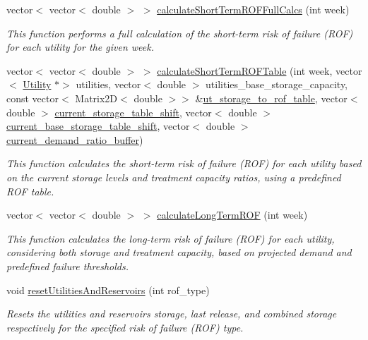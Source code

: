 \begin{DoxyCompactItemize}
vector$<$ vector$<$ double $>$ $>$ \mbox{\hyperlink{classContinuityModelROF_a975e7566b4c0db6e3731647b6e76b9c8}{calculate\+Short\+Term\+R\+O\+F\+Full\+Calcs}} (int week)
\begin{DoxyCompactList}\small\item\em This function performs a full calculation of the short-\/term risk of failure (R\+OF) for each utility for the given week. \end{DoxyCompactList}\item 
vector$<$ vector$<$ double $>$ $>$ \mbox{\hyperlink{classContinuityModelROF_a48b31e060f1d75e31fa591015f4a1c22}{calculate\+Short\+Term\+R\+O\+F\+Table}} (int week, vector$<$ \mbox{\hyperlink{classUtility}{Utility}} $\ast$$>$ utilities, vector$<$ double $>$ utilities\+\_\+base\+\_\+storage\+\_\+capacity, const vector$<$ Matrix2D$<$ double $>$$>$ \&\mbox{\hyperlink{classContinuityModelROF_ada25d241caf860255ad00097f5e7adb6}{ut\+\_\+storage\+\_\+to\+\_\+rof\+\_\+table}}, vector$<$ double $>$ \mbox{\hyperlink{classContinuityModelROF_a443efa8d5a8bcbb1fea1a0bc929c77cd}{current\+\_\+storage\+\_\+table\+\_\+shift}}, vector$<$ double $>$ \mbox{\hyperlink{classContinuityModelROF_acaebccba4f4ed286c5da02d6c2c90605}{current\+\_\+base\+\_\+storage\+\_\+table\+\_\+shift}}, vector$<$ double $>$ \mbox{\hyperlink{classContinuityModelROF_a1a274033b741e664268515de8e8eb3bc}{current\+\_\+demand\+\_\+ratio\+\_\+buffer}})
\begin{DoxyCompactList}\small\item\em This function calculates the short-\/term risk of failure (R\+OF) for each utility based on the current storage levels and treatment capacity ratios, using a predefined R\+OF table. \end{DoxyCompactList}\item 
vector$<$ vector$<$ double $>$ $>$ \mbox{\hyperlink{classContinuityModelROF_a0b66880fe153cbd0b85a5b416b98e9a6}{calculate\+Long\+Term\+R\+OF}} (int week)
\begin{DoxyCompactList}\small\item\em This function calculates the long-\/term risk of failure (R\+OF) for each utility, considering both storage and treatment capacity, based on projected demand and predefined failure thresholds. \end{DoxyCompactList}\item 
void \mbox{\hyperlink{classContinuityModelROF_acd72d71a29cef49c4de3d111378b76c7}{reset\+Utilities\+And\+Reservoirs}} (int rof\+\_\+type)
\begin{DoxyCompactList}\small\item\em Resets the utilities\textquotesingle{} and reservoirs\textquotesingle{} storage, last release, and combined storage respectively for the specified risk of failure (R\+OF) type. \end{DoxyCompactList}\item 

\end{DoxyCompactItemize}
